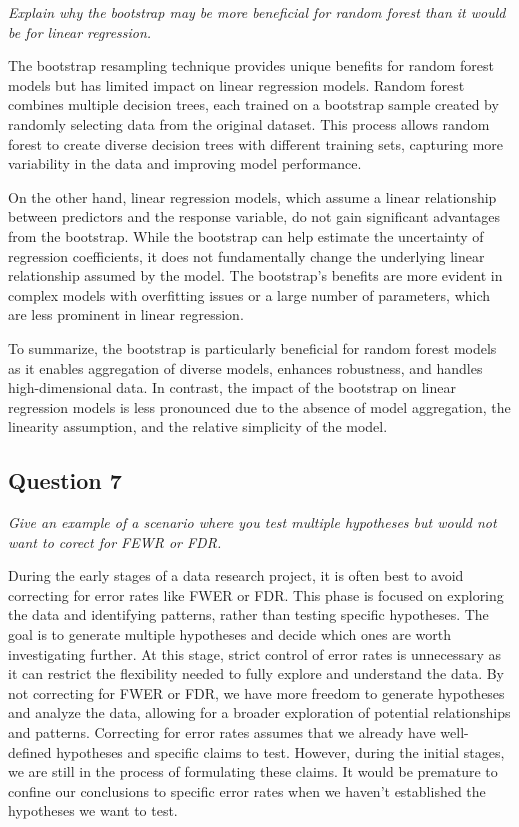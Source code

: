\documentclass[
]{article}
\begin{document}
\emph{Explain why the bootstrap may be more beneficial for random forest
than it would be for linear regression.}

The bootstrap resampling technique provides unique benefits for random
forest models but has limited impact on linear regression models. Random
forest combines multiple decision trees, each trained on a bootstrap
sample created by randomly selecting data from the original dataset.
This process allows random forest to create diverse decision trees with
different training sets, capturing more variability in the data and
improving model performance.

On the other hand, linear regression models, which assume a linear
relationship between predictors and the response variable, do not gain
significant advantages from the bootstrap. While the bootstrap can help
estimate the uncertainty of regression coefficients, it does not
fundamentally change the underlying linear relationship assumed by the
model. The bootstrap's benefits are more evident in complex models with
overfitting issues or a large number of parameters, which are less
prominent in linear regression.

To summarize, the bootstrap is particularly beneficial for random forest
models as it enables aggregation of diverse models, enhances robustness,
and handles high-dimensional data. In contrast, the impact of the
bootstrap on linear regression models is less pronounced due to the
absence of model aggregation, the linearity assumption, and the relative
simplicity of the model.

\hypertarget{question-7}{%
\subsection{Question 7}\label{question-7}}

\emph{Give an example of a scenario where you test multiple hypotheses
but would not want to corect for FEWR or FDR.}

During the early stages of a data research project, it is often best to
avoid correcting for error rates like FWER or FDR. This phase is focused
on exploring the data and identifying patterns, rather than testing
specific hypotheses. The goal is to generate multiple hypotheses and
decide which ones are worth investigating further. At this stage, strict
control of error rates is unnecessary as it can restrict the flexibility
needed to fully explore and understand the data. By not correcting for
FWER or FDR, we have more freedom to generate hypotheses and analyze the
data, allowing for a broader exploration of potential relationships and
patterns. Correcting for error rates assumes that we already have
well-defined hypotheses and specific claims to test. However, during the
initial stages, we are still in the process of formulating these claims.
It would be premature to confine our conclusions to specific error rates
when we haven't established the hypotheses we want to test.
\end{document}
